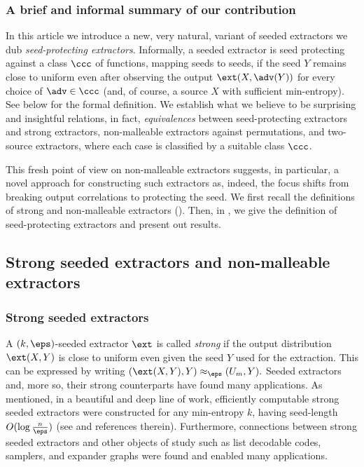 \subsubsection*{A brief and informal summary of our contribution}
%

In this %
article  %
we introduce a new, very natural, variant of seeded extractors we dub \emph{seed-protecting extractors}. Informally, a seeded extractor is seed protecting 
against a class %
$\ccc$ of functions,
mapping seeds to seeds, if the seed $Y$ remains close to uniform even after observing the output $\ext(X,\adv(Y))$ for every choice of $\adv \in \ccc$ (and, of course, a source $X$ with sufficient min-entropy). See  below for the formal definition. We establish what we believe to be surprising and insightful relations, in fact, \emph{equivalences} between seed-protecting extractors and strong extractors, non-malleable extractors against permutations, and two-source extractors, where each case is classified by a suitable class $\ccc$. 
 
 This fresh point of view on non-malleable extractors suggests, in particular, a novel approach for constructing such extractors as, indeed, the focus shifts from breaking output correlations to protecting the seed.  
%
 We first recall the definitions of strong and non-malleable extractors (). Then, in , we give the definition of seed-protecting extractors and present out results.

%
%

%

\subsection{Strong seeded extractors and non-malleable extractors}\label{sec:strong and nm}

%
%
\subsubsection{Strong seeded extractors}
%
A $(k,\eps)$-seeded extractor $\ext$ is called \emph{strong} if the output distribution $\ext(X,Y)$ is close to uniform even given the seed $Y$ used for the extraction. This can be expressed by writing
$
(\ext(X,Y),Y) \approx_\eps (U_m,Y).
$
Seeded extractors and, more so, their strong counterparts have found many applications. As mentioned, in a beautiful and deep line of work, efficiently computable strong seeded extractors were constructed for any min-entropy $k$, having seed-length $O(\log\frac{n}{\eps})$ (see \cite{GUV09,DKSS13,TSU12} and references therein). Furthermore,  connections between strong seeded extractors and other objects of study such as list decodable codes, samplers, and expander graphs were found and enabled many applications.%

